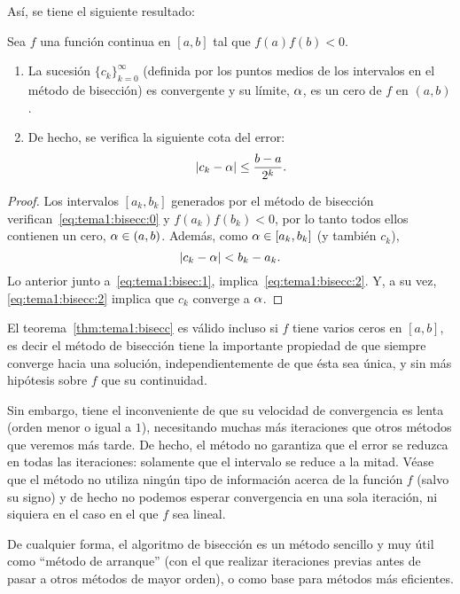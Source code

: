 Así, se tiene el siguiente resultado:
\begin{theorem}
  \label{thm:tema1:bisecc}
  Sea $f$ una función continua en $[a,b]$ tal que $f(a)f(b)<0$.
  \begin{enumerate}
  \item La sucesión $\{c_k\}_{k=0}^\infty$ (definida por los puntos
    medios de los intervalos en el método de bisección) es convergente
    y su límite, $\alpha$, es un cero de $f$ en $(a,b)$.
  \item De hecho, se verifica la siguiente cota del error:
    \begin{equation}
      \label{eq:tema1:bisecc:2}
      |c_k-\alpha| \le \frac{b-a}{2^k}.
    \end{equation}
  \end{enumerate}
\end{theorem}

\begin{proof}
  Los intervalos $[a_k,b_k]$ generados por el método de bisección
  verifican~\eqref{eq:tema1:bisecc:0} y $f(a_k)f(b_k)<0$, por lo tanto
  todos ellos contienen un cero, $\alpha\in (a,b)$. Además, como
  $\alpha\in [a_k,b_k]$ (y también $c_k$),
  $$
  |c_k - \alpha| < b_k - a_k.
  $$
  Lo anterior junto a~\eqref{eq:tema1:bisec:1},
  implica~\eqref{eq:tema1:bisecc:2}. Y, a su vez,
  \eqref{eq:tema1:bisecc:2} implica que $c_k$ converge a $\alpha$.
\end{proof}

\begin{remark}
  \label{rk:tema1:unicidad-bisecc}
  El teorema~\ref{thm:tema1:bisecc} es válido incluso si $f$ tiene
  varios ceros en $[a,b]$, es decir el método de bisección tiene la
  importante propiedad de que siempre converge hacia una solución,
  independientemente de que ésta sea única, y sin más hipótesis sobre
  $f$ que su continuidad.

  Sin embargo, tiene el inconveniente de que su velocidad de
  convergencia es lenta (orden menor o igual a $1$), necesitando
  muchas más iteraciones que otros métodos que veremos más tarde. De
  hecho, el método no garantiza que el error se reduzca en todas las
  iteraciones: solamente que el intervalo se reduce a la mitad. Véase
  que el método no utiliza ningún tipo de información acerca de la
  función $f$ (salvo su signo) y de hecho no podemos esperar
  convergencia en una sola iteración, ni siquiera en el caso en el que
  $f$ sea lineal.

  De cualquier forma, el algoritmo de bisección es un método sencillo y
  muy útil como ``método de arranque'' (con el que realizar iteraciones
  previas antes de pasar a otros métodos de mayor orden), o como base
  para métodos más eficientes.
 \end{remark}

